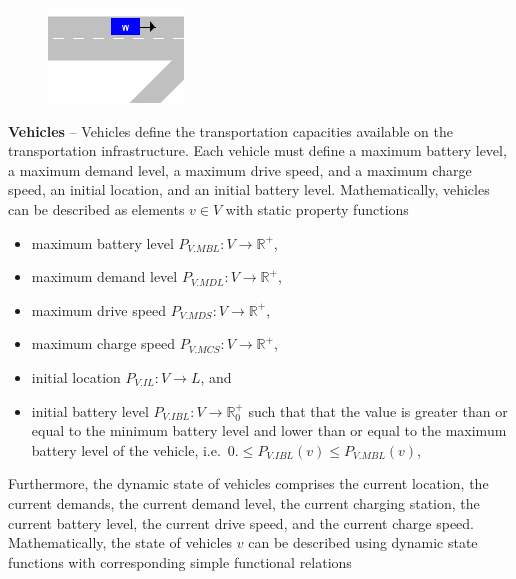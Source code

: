 \documentclass[graybox]{svmult}
\begin{document}
\begin{figure}
	\centering
	\includegraphics[scale=0.7]{../../concepts/vehicle.png}
\end{figure}
\noindent
\textbf{Vehicles}
--
Vehicles define the transportation capacities available on the transportation infrastructure.
Each vehicle must define a maximum battery level, a maximum demand level, a maximum drive speed, and a maximum charge speed, an initial location, and an initial battery level.
Mathematically, vehicles can be described as elements $v \in V$ with static property functions
\begin{itemize}
	\item maximum battery level $P_{V.MBL}: V \rightarrow \mathbb{R}^+$,
	\item maximum demand level $P_{V.MDL}: V \rightarrow \mathbb{R}^+$,
	\item maximum drive speed $P_{V.MDS}: V \rightarrow \mathbb{R}^+$,
	\item maximum charge speed $P_{V.MCS}: V \rightarrow \mathbb{R}^+$,
	\item initial location $P_{V.IL}: V \rightarrow L$, and
	\item initial battery level $P_{V.IBL}: V \rightarrow \mathbb{R}_0^+$ such that that the value is greater than or equal to the minimum battery level and lower than or equal to the maximum battery level of the vehicle, i.e.\ $0. \leq P_{V.IBL}(v) \leq P_{V.MBL}(v)$,
\end{itemize}
Furthermore, the dynamic state of vehicles comprises the current location, the current demands, the current demand level, the current charging station, the current battery level, the current drive speed, and the current charge speed.
Mathematically, the state of vehicles $v$ can be described using dynamic state functions with corresponding simple functional relations
\end{document}
